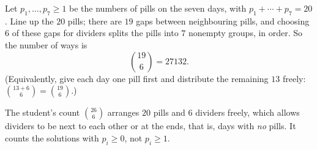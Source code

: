 Let $p_1,\dots,p_7\ge1$ be the numbers of pills on the seven days, with $p_1+\cdots+p_7=20$. Line up the $20$ pills; there are $19$ gaps between neighbouring pills, and choosing $6$ of these gaps for dividers splits the pills into $7$ nonempty groups, in order. So the number of ways is
\[
\binom{19}{6}=\boxed{27132}.
\]
(Equivalently, give each day one pill first and distribute the remaining $13$ freely: $\binom{13+6}{6}=\binom{19}{6}$.)

The student's count $\binom{26}{6}$ arranges $20$ pills and $6$ dividers freely, which allows dividers to be next to each other or at the ends, that is, days with \emph{no} pills. It counts the solutions with $p_i\ge0$, not $p_i\ge1$.
